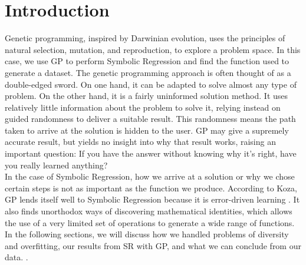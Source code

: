 
\section{Introduction}
\label{sec:intro}

Genetic programming, inspired by Darwinian evolution, uses the principles of natural selection, mutation, and reproduction, to explore a problem space. In this case, we use GP to perform Symbolic Regression and find the function used to generate a dataset. The genetic programming approach is often thought of as a double-edged sword. On one hand, it can be adapted to solve almost any type of problem. On the other hand, it is a fairly uninformed solution method. It uses relatively little information about the problem to solve it, relying instead on guided randomness to deliver a suitable result. This randomness means the path taken to arrive at the solution is hidden to the user. GP may give a supremely accurate result, but yields no insight into why that result works, raising an important question: If you have the answer without knowing why it’s right, have you really learned anything? \\
In the case of Symbolic Regression, how we arrive at a solution or why we chose certain steps is not as important as the function we produce. According to Koza, GP lends itself well to Symbolic Regression because it is error-driven learning \cite{Koza97geneticprogramming}.  It also finds unorthodox ways of discovering mathematical identities, which allows the use of a very limited set of operations to generate a wide range of functions.
In the following sections, we will discuss how we handled problems of diversity and overfitting, our results from SR with GP, and what we can conclude from our data.
. \\



